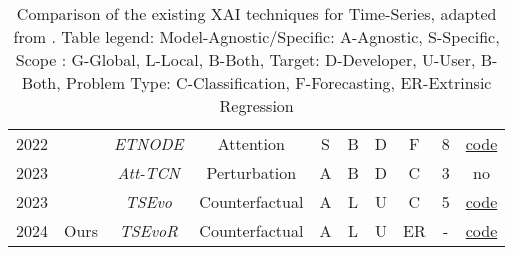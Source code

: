 \begin{table*}[h!]
\begin{tabular}{@{}cccccccccc@{}}
    2022        &\cite{gao_explainable_2022}       &  \textit{ETNODE}  & Attention     &S       & B          & D      & F                        & 8                 & \href{https://github.com/PengleiGao/ETN-ODE}{code} \\  

    2023        &\cite{zhao_explainable_2023}                &\textit{Att-TCN}   & Perturbation             & A             & B             & D          & C                    & 3                 & no \\ 

    2023        & \cite{hollig_tsevo_2022}           & \textit{TSEvo}& Counterfactual           & A             & L             & U         & C                                 & 5                 & \href{https://github.com/fzi-forschungszentrum-informatik/TSInterpret}{code} \\

    2024        & Ours           & \textit{TSEvoR}& Counterfactual           & A             & L             & U         & ER                   & -                 & \href{https://github.com/AlexisTabin/BA-Estimation-TCN}{code} \\

    \bottomrule
  \end{tabular}
  \label{table:xai-survey}
  \caption{Comparison of the existing XAI techniques for Time-Series, adapted from \cite{rojat_explainable_2021}. Table legend: Model-Agnostic/Specific: A-Agnostic, S-Specific, Scope : G-Global, L-Local, B-Both, Target: D-Developer, U-User, B-Both, Problem Type: C-Classification, F-Forecasting, ER-Extrinsic Regression}
\end{table*}